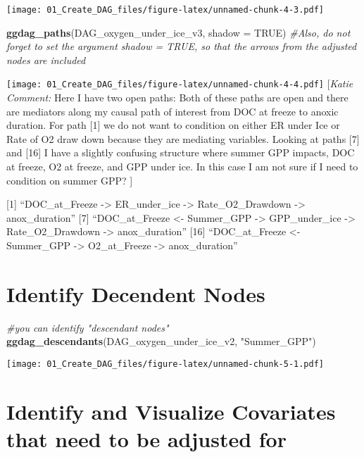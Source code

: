 \documentclass[
]{article}
\newenvironment{Shaded}{\begin{snugshade}}{\end{snugshade}}
\newcommand{\AttributeTok}[1]{\textcolor[rgb]{0.13,0.29,0.53}{#1}}
\newcommand{\CommentTok}[1]{\textcolor[rgb]{0.56,0.35,0.01}{\textit{#1}}}
\newcommand{\ConstantTok}[1]{\textcolor[rgb]{0.56,0.35,0.01}{#1}}
\newcommand{\FunctionTok}[1]{\textcolor[rgb]{0.13,0.29,0.53}{\textbf{#1}}}
\newcommand{\NormalTok}[1]{#1}
\newcommand{\StringTok}[1]{\textcolor[rgb]{0.31,0.60,0.02}{#1}}
\begin{document}
\texttt{[image: 01\_Create\_DAG\_files/figure-latex/unnamed-chunk-4-3.pdf]}

\begin{Shaded}
\begin{Highlighting}[]
\FunctionTok{ggdag\_paths}\NormalTok{(DAG\_oxygen\_under\_ice\_v3, }\AttributeTok{shadow =} \ConstantTok{TRUE}\NormalTok{) }\CommentTok{\#Also, do not forget to set the argument shadow = TRUE, so that the arrows from the adjusted nodes are included}
\end{Highlighting}
\end{Shaded}

\texttt{[image: 01\_Create\_DAG\_files/figure-latex/unnamed-chunk-4-4.pdf]}
{ {[}\emph{Katie Comment:} Here I have two open paths: Both of these
paths are open and there are mediators along my causal path of interest
from DOC at freeze to anoxic duration. For path {[}1{]} we do not want
to condition on either ER under Ice or Rate of O2 draw down because they
are mediating variables. Looking at paths {[}7{]} and {[}16{]} I have a
slightly confusing structure where summer GPP impacts, DOC at freeze, O2
at freeze, and GPP under ice. In this case I am not sure if I need to
condition on summer GPP? {]} }

{[}1{]} ``DOC\_at\_Freeze -\textgreater{} ER\_under\_ice -\textgreater{}
Rate\_O2\_Drawdown -\textgreater{} anox\_duration'' {[}7{]}
``DOC\_at\_Freeze \textless- Summer\_GPP -\textgreater{} GPP\_under\_ice
-\textgreater{} Rate\_O2\_Drawdown -\textgreater{} anox\_duration''
{[}16{]} ``DOC\_at\_Freeze \textless- Summer\_GPP -\textgreater{}
O2\_at\_Freeze -\textgreater{} anox\_duration''

\section{Identify Decendent Nodes}\label{identify-decendent-nodes}

\begin{Shaded}
\begin{Highlighting}[]
\CommentTok{\#you can identify "descendant nodes" }
\FunctionTok{ggdag\_descendants}\NormalTok{(DAG\_oxygen\_under\_ice\_v2, }\StringTok{"Summer\_GPP"}\NormalTok{)}
\end{Highlighting}
\end{Shaded}

\texttt{[image: 01\_Create\_DAG\_files/figure-latex/unnamed-chunk-5-1.pdf]}

\section{Identify and Visualize Covariates that need to be adjusted
for}\label{identify-and-visualize-covariates-that-need-to-be-adjusted-for}
\end{document}
